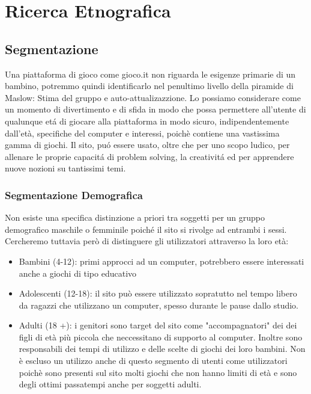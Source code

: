 \documentclass[../Report.tex]{subfiles}
\begin{document}
    \chapter{Ricerca Etnografica}
    \label{chapter:ricerca etnografica}
    \section{Segmentazione}
    Una piattaforma di gioco come gioco.it non riguarda le esigenze primarie di un bambino, potremmo quindi  identificarlo nel penultimo livello della piramide di Maslow: Stima del gruppo e auto-attualizazzione.
    Lo possiamo considerare come un momento di divertimento e di sfida in modo che possa permettere all’utente di qualunque etá di giocare alla piattaforma in modo sicuro, indipendentemente dall’età, specifiche del computer e interessi, poichè contiene una vastissima gamma di giochi. 
    Il sito, puó essere usato, oltre che per uno scopo ludico, per allenare le proprie capacitá di problem solving, la creativitá ed per apprendere nuove nozioni su tantissimi temi.

    \subsection{Segmentazione Demografica}
    
    Non esiste una specifica distinzione a priori tra soggetti per un gruppo demografico maschile o femminile poiché il sito si rivolge ad entrambi i sessi. Cercheremo tuttavia però di distinguere gli utilizzatori attraverso la loro età:
    \begin{itemize}
        \item Bambini (4-12): primi approcci ad un computer, potrebbero essere interessati anche a giochi di tipo educativo
        \item Adolescenti (12-18): il sito può essere utilizzato sopratutto nel tempo libero da ragazzi che utilizzano un computer, spesso durante le pause dallo studio. 
        \item Adulti (18 +): i genitori sono target del sito come "accompagnatori" dei dei figli di età più piccola che neccessitano di supporto al computer. Inoltre sono responsabili dei tempi di utilizzo e delle scelte di giochi dei loro bambini. Non è escluso un utilizzo anche di questo segmento di utenti come utilizzatori poichè sono presenti sul sito molti giochi che non hanno limiti di età e sono degli ottimi passatempi anche per soggetti adulti. 
    \end{itemize}
\end{document}
